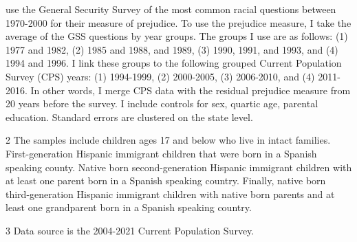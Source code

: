 \begin{table}[H]
{\begin{threeparttable}
\begin{tablenotes}
{                      \citet{charlesPrejudiceWagesEmpirical2008} use the General Security Survey of the most common racial questions between 1970-2000 for their measure of prejudice.
                      To use the prejudice   measure, I take the average of the GSS questions by year groups. The groups I use are as follows:
                      (1) 1977 and 1982, (2) 1985 and 1988, and 1989, (3) 1990, 1991, and 1993, and (4) 1994 and 1996. I link these groups to the following
                      grouped Current Population Survey (CPS) years: (1) 1994-1999, (2) 2000-2005, (3) 2006-2010, and (4) 2011-2016. 
                      In other words, I merge CPS data with the residual prejudice  measure from 20 years before the survey.
                      I include controls for sex, quartic age, parental education.
                      Standard errors are clustered on the state level.}
\item[2] \footnotesize{The samples include children ages 17 and below who live in intact families. 
                      First-generation Hispanic immigrant children that were born in a 
                      Spanish speaking county. Native born second-generation Hispanic 
                      immigrant children with at least one parent born in a Spanish speaking 
                      country. Finally, native born third-generation Hispanic immigrant children 
                      with native born parents and at least one grandparent born in a Spanish 
                      speaking country.}
\item[3] \footnotesize{Data source is the 2004-2021 Current Population Survey.}
\end{tablenotes}
\end{threeparttable}}
\end{table}

